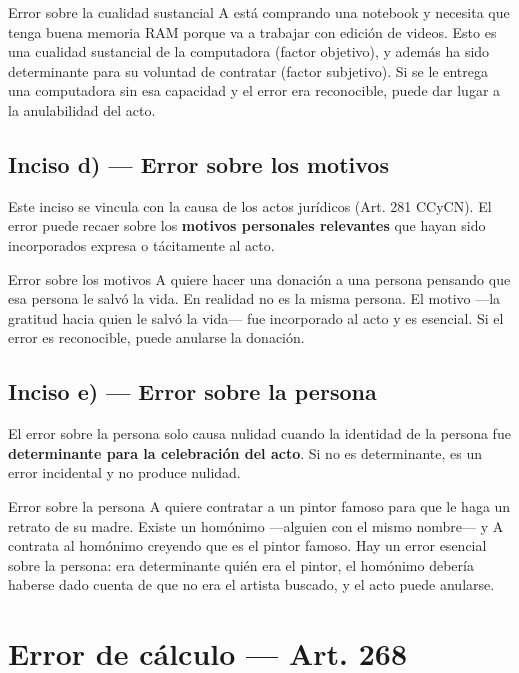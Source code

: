 \documentclass[12pt,oneside]{book}
\begin{document}
\begin{example}{Error sobre la cualidad sustancial}
A está comprando una notebook y necesita que tenga buena memoria RAM porque va a trabajar con edición de videos. Esto es una cualidad sustancial de la computadora (factor objetivo), y además ha sido determinante para su voluntad de contratar (factor subjetivo). Si se le entrega una computadora sin esa capacidad y el error era reconocible, puede dar lugar a la anulabilidad del acto.
\end{example}

\subsection{Inciso d) --- Error sobre los motivos}

Este inciso se vincula con la causa de los actos jurídicos (Art. 281 CCyCN). El error puede recaer sobre los \textbf{motivos personales relevantes} que hayan sido incorporados expresa o tácitamente al acto.

\begin{example}{Error sobre los motivos}
A quiere hacer una donación a una persona pensando que esa persona le salvó la vida. En realidad no es la misma persona. El motivo ---la gratitud hacia quien le salvó la vida--- fue incorporado al acto y es esencial. Si el error es reconocible, puede anularse la donación.
\end{example}

\subsection{Inciso e) --- Error sobre la persona}

El error sobre la persona solo causa nulidad cuando la identidad de la persona fue \textbf{determinante para la celebración del acto}. Si no es determinante, es un error incidental y no produce nulidad.

\begin{example}{Error sobre la persona}
A quiere contratar a un pintor famoso para que le haga un retrato de su madre. Existe un homónimo ---alguien con el mismo nombre--- y A contrata al homónimo creyendo que es el pintor famoso. Hay un error esencial sobre la persona: era determinante quién era el pintor, el homónimo debería haberse dado cuenta de que no era el artista buscado, y el acto puede anularse.
\end{example}

\section{Error de cálculo --- Art. 268}
\end{document}

